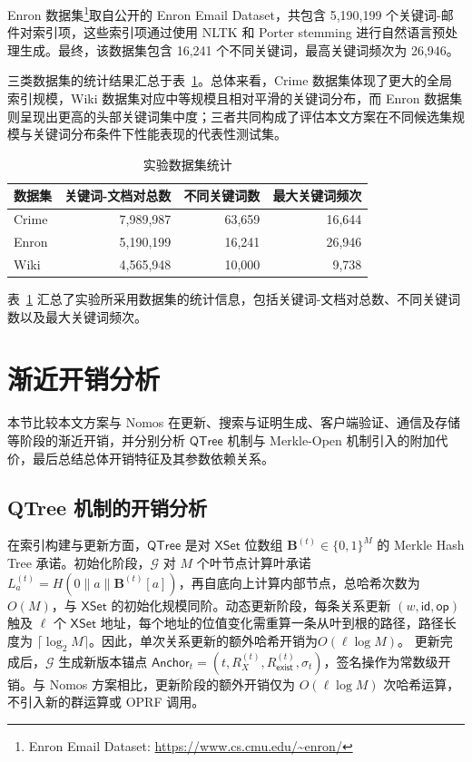 Enron 数据集\footnote{Enron Email Dataset: \url{https://www.cs.cmu.edu/~enron/}}取自公开的 Enron Email Dataset，共包含 5,190,199 个关键词-邮件对索引项，这些索引项通过使用 NLTK 和 Porter stemming 进行自然语言预处理生成。最终，该数据集包含 16,241 个不同关键词，最高关键词频次为 26,946。

三类数据集的统计结果汇总于表~\ref{tab:exp-datasets}。总体来看，Crime 数据集体现了更大的全局索引规模，Wiki 数据集对应中等规模且相对平滑的关键词分布，而 Enron 数据集则呈现出更高的头部关键词集中度；三者共同构成了评估本文方案在不同候选集规模与关键词分布条件下性能表现的代表性测试集。

\begin{table}[h]
\centering
\footnotesize
\caption{实验数据集统计}
\label{tab:exp-datasets}
\begin{tabular}{@{}lrrr@{}}
\toprule
数据集 & 关键词-文档对总数 & 不同关键词数 & 最大关键词频次 \\
\midrule
Crime & 7,989,987 & 63,659 & 16,644 \\
Enron & 5,190,199 & 16,241 & 26,946 \\
Wiki & 4,565,948 & 10,000 & 9,738 \\
\bottomrule
\end{tabular}
\end{table}

表~\ref{tab:exp-datasets} 汇总了实验所采用数据集的统计信息，包括关键词-文档对总数、不同关键词数以及最大关键词频次。

\section{渐近开销分析}\label{sec:overhead-analysis}

本节比较本文方案与 Nomos 在更新、搜索与证明生成、客户端验证、通信及存储等阶段的渐近开销，并分别分析 $\mathsf{QTree}$ 机制与 Merkle-Open 机制引入的附加代价，最后总结总体开销特征及其参数依赖关系。

\subsection{QTree 机制的开销分析}\label{sec:qtree-overhead}

在索引构建与更新方面，$\mathsf{QTree}$ 是对 $\mathsf{XSet}$ 位数组 $\mathbf{B}^{(t)}\in\{0,1\}^M$ 的 Merkle Hash Tree 承诺。初始化阶段，$\mathcal{G}$ 对 $M$ 个叶节点计算叶承诺 $L_a^{(t)}=H(0\|a\|\mathbf{B}^{(t)}[a])$，再自底向上计算内部节点，总哈希次数为 $O(M)$，与 $\mathsf{XSet}$ 的初始化规模同阶。动态更新阶段，每条关系更新 $(w,\mathsf{id},\mathsf{op})$ 触及 $\ell$ 个 $\mathsf{XSet}$ 地址，每个地址的位值变化需重算一条从叶到根的路径，路径长度为 $\lceil\log_2 M\rceil$。因此，单次关系更新的额外哈希开销为$O(\ell\log M)$。
更新完成后，$\mathcal{G}$ 生成新版本锚点 $\mathsf{Anchor}_t=(t,R_X^{(t)},R_{\mathsf{exist}}^{(t)},\sigma_t)$，签名操作为常数级开销。与 Nomos 方案相比，更新阶段的额外开销仅为 $O(\ell\log M)$ 次哈希运算，不引入新的群运算或 OPRF 调用。

